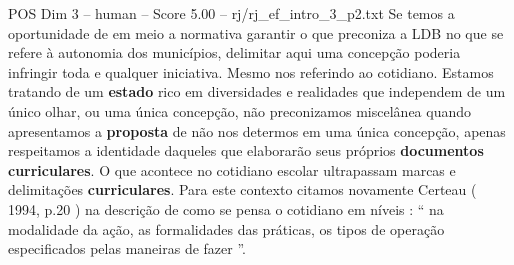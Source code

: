\begin{textsample}{POS Dim 3 – human – Score 5.00 – rj/rj\_ef\_intro\_3\_p2.txt}  \label{ex:f3_pos_020}
Se temos a oportunidade de em meio a normativa garantir o que preconiza a LDB no que se refere à autonomia dos municípios, delimitar aqui uma concepção poderia infringir toda e qualquer iniciativa.
Mesmo nos referindo ao cotidiano.
Estamos tratando de um \textbf{estado} rico em diversidades e realidades que independem de um único olhar, ou uma única concepção, não preconizamos miscelânea quando apresentamos a \textbf{proposta} de não nos determos em uma única concepção, apenas respeitamos a identidade daqueles que elaborarão seus próprios \textbf{documentos} \textbf{curriculares}.
O que acontece no cotidiano escolar ultrapassam marcas e delimitações \textbf{curriculares}.
Para este contexto citamos novamente Certeau ( 1994, p.20 ) na descrição de como se pensa o cotidiano em níveis : “ na modalidade da ação, as formalidades das práticas, os tipos de operação especificados pelas maneiras de fazer ”.

\end{textsample}
